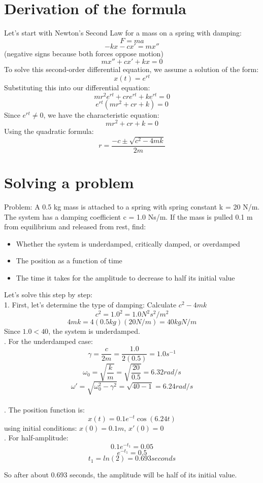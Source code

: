 \documentclass{article}
\begin{document}
\section{Derivation of the formula}
Let's start with Newton's Second Law for a mass on a spring with damping:
\[F = ma\]
\[-kx - cx' = mx''\]  (negative signs because both forces oppose motion)
\[mx'' + cx' + kx = 0\]
To solve this second-order differential equation, we assume a solution of the form:
\[x(t) = e^{rt}\]
Substituting this into our differential equation:
\[mr^2e^{rt} + cre^{rt} + ke^{rt} = 0\]
\[e^{rt}(mr^2 + cr + k) = 0\]
Since $e^{rt} \neq 0$, we have the characteristic equation:
\[mr^2 + cr + k = 0\]
Using the quadratic formula:
\[r = \frac{-c \pm \sqrt{c^2 - 4mk}}{2m}\]

\section{Solving a problem}
Problem: A 0.5 kg mass is attached to a spring with spring constant k = 20 N/m. The system has a damping coefficient c = 1.0 Ns/m. If the mass is pulled 0.1 m from equilibrium and released from rest, find:
\begin{itemize}
    \item Whether the system is underdamped, critically damped, or overdamped
    \item The position as a function of time
    \item The time it takes for the amplitude to decrease to half its initial value
\end{itemize}
Let's solve this step by step:\\
1. First, let's determine the type of damping:
Calculate $c^2 - 4mk$
\[c^2 = 1.0^2 = 1.0 N^2s^2/m^2\]
\[4mk = 4(0.5 kg)(20 N/m) = 40 kgN/m\]
Since $1.0 < 40$, the system is underdamped.\\

. For the underdamped case:
\[\gamma = \frac{c}{2m} = \frac{1.0}{2(0.5)} = 1.0 s^{-1}\]
\[\omega_0 = \sqrt{\frac{k}{m}} = \sqrt{\frac{20}{0.5}} = 6.32 rad/s\]
\[\omega ' = \sqrt{\omega_0^2 - \gamma^2} = \sqrt{40 - 1} = 6.24 rad/s\]\\

. The position function is:
\[x(t) = 0.1e^{-t}\cos(6.24t)\]
using initial conditions: $x(0) = 0.1 m$, $x'(0) = 0$\\

. For half-amplitude:
\[0.1e^{-t_1} = 0.05\]
\[e^{-t_1} = 0.5\]
\[t_1 = ln(2) = 0.693 seconds\]

So after about 0.693 seconds, the amplitude will be half of its initial value.
\end{document}
